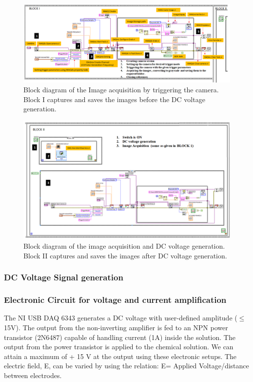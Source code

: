 \documentclass[journal=jacsat,manuscript=article]{achemso}
\begin{document}
\begin{figure}[H]
	\centering
	\includegraphics[width=1.3\linewidth,angle=90 ]{Block_1.png}
	\caption{Block diagram of the Image acquisition by triggering the
		camera. Block I captures and saves the images before the DC
		voltage generation.}
	\label{fig:ex4}
\end{figure}

\begin{figure}[H]
	\centering
	\includegraphics[width=1.3\linewidth,angle=90]{Block_2.png}
	\caption{Block diagram of the image acquisition and DC voltage
		generation. Block II captures and saves the images after DC
		voltage generation.}
	\label{fig:ex5}
\end{figure}


\subsubsection{DC Voltage Signal generation}
\subsubsection{Electronic Circuit for voltage and current amplification}
The NI USB DAQ 6343 generates a DC voltage with user-defined amplitude ($\leq$15V). The output from the non-inverting amplifier is fed to an NPN power transistor (2N6487) capable of handling current (1A) inside the solution. The output from the power transistor is applied to the chemical solution. We can attain a maximum of + 15 V at the output using these electronic setups. The electric field, E, can be varied by using the relation: E= Applied Voltage/distance between electrodes.
\end{document}
